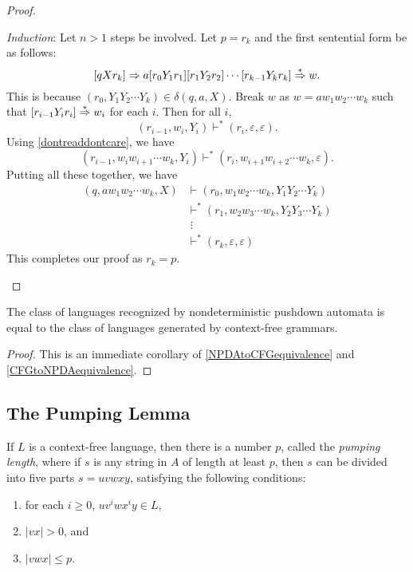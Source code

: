 \begin{proof}
\begin{itemize}
        \vspace{1mm}
        \textit{Induction}: Let $n>1$ steps be involved. Let $p=r_k$ and the first sentential form be as follows:
        $$[qXr_k]\Rightarrow a[r_0Y_1r_1][r_1Y_2r_2]\cdots[r_{k-1}Y_kr_k]\overset{*}{\Rightarrow} w.$$
        This is because $(r_0,Y_1Y_2\cdots Y_k)\in\delta(q,a,X)$. Break $w$ as $w=aw_1w_2\cdots w_k$ such that $[r_{i-1}Y_ir_i]\overset{*}{\Rightarrow} w_i$ for each $i$. Then for all $i$,
        $$(r_{i-1}, w_i, Y_i)\vdash^* (r_i,\varepsilon,\varepsilon).$$
        Using \ref{dontreaddontcare}, we have
        $$(r_{i-1}, w_iw_{i+1}\cdots w_k, Y_i)\vdash^* (r_i,w_{i+1}w_{i+2}\cdots w_k,\varepsilon).$$
        Putting all these together, we have
        \begin{align*}
            (q,aw_1w_2\cdots w_k, X)&\vdash (r_0, w_1w_2\cdots w_k, Y_1Y_2\cdots Y_k) \\
            &\vdash^* (r_1, w_2w_3\cdots w_k, Y_2Y_3\cdots Y_k) \\
            &\; \vdots \\
            &\vdash^* (r_k,\varepsilon,\varepsilon)
        \end{align*}
        This completes our proof as $r_k=p$.
    \end{itemize}
\end{proof}

\begin{theorem}
    The class of languages recognized by nondeterministic pushdown automata is equal to the class of languages generated by context-free grammars.
\end{theorem}
\begin{proof}
    This is an immediate corollary of \ref{NPDAtoCFGequivalence} and \ref{CFGtoNPDAequivalence}.
\end{proof}

\subsection{The Pumping Lemma}

\begin{lemma}
    If $L$ is a context-free language, then there is a number $p$, called the \textit{pumping length}, where if $s$ is any string in $A$ of length at least $p$, then $s$ can be divided into five parts $s=uvwxy$, satisfying the following conditions:
    \begin{enumerate}
        \item for each $i\geq 0$, $uv^iwx^iy\in L$,
        \item $|vx|>0$, and
        \item $|vwx|\leq p$.
    \end{enumerate}
\end{lemma}